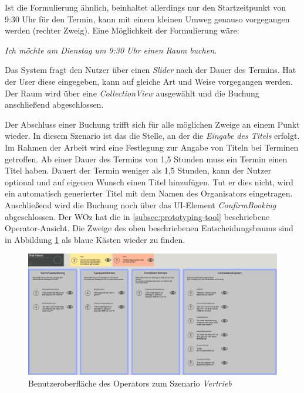 Ist die Formulierung ähnlich, beinhaltet allerdings nur den Startzeitpunkt von 9:30 Uhr für den Termin, kann mit einem kleinen Umweg genauso vorgegangen werden (rechter Zweig). Eine Möglichkeit der Formulierung wäre:

\begin{center}
    \textit{Ich möchte am Dienstag um 9:30 Uhr einen Raum buchen.}
\end{center}

Das System fragt den Nutzer über einen \textit{Slider} nach der Dauer des Termins. Hat der User diese eingegeben, kann auf gleiche Art und Weise vorgegangen werden. Der Raum wird über eine \textit{CollectionView} ausgewählt und die Buchung anschließend \mbox{abgeschlossen}. 

Der Abschluss einer Buchung trifft sich für alle möglichen Zweige an einem Punkt wieder. In diesem Szenario ist das die Stelle, an der die \textit{Eingabe des Titels} erfolgt. Im Rahmen der Arbeit wird eine Festlegung zur Angabe von Titeln bei Terminen getroffen. Ab einer Dauer des Termins von 1,5 Stunden muss ein Termin einen Titel haben. Dauert der Termin weniger als 1,5 Stunden, kann der Nutzer optional und auf eigenen Wunsch einen Titel hinzufügen. Tut er dies nicht, wird ein automatisch generierter Titel mit dem Namen des Organisators eingetragen. Anschließend wird die Buchung noch über das \ac{UI}-Element \textit{ConfirmBooking} abgeschlossen.
\clearpage
Der \acl{WOz} hat die in \ref{subsec:prototyping-tool} beschriebene Operator-Ansicht. Die Zweige des oben beschriebenen Entscheidungsbaums sind in Abbildung \ref{fig:operator-screen-vertrieb} als blaue Kästen wieder zu finden. 
\newline

\begin{figure}[H]
    \centering
    \includegraphics[width=1.0\textwidth]{bilder/OperatorSzenarioVertrieb.png}
    \caption{Benutzeroberfläche des Operators zum Szenario \textit{Vertrieb}}
    \label{fig:operator-screen-vertrieb}
\end{figure}

